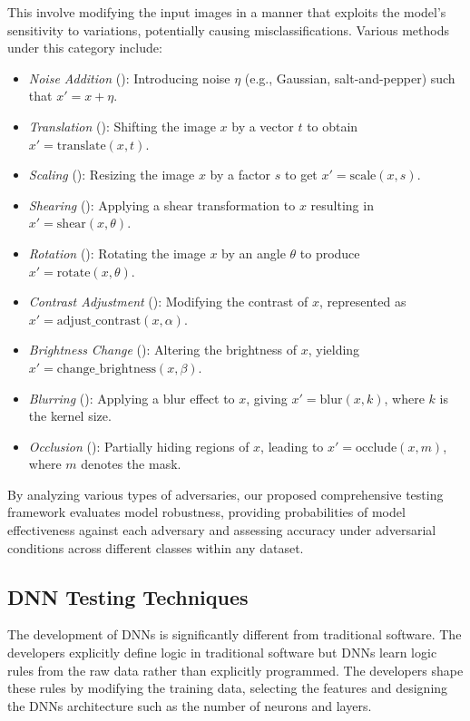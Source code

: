 \documentclass[10pt, conference, a4paper, final]{IEEEtran}
\begin{document}
This involve modifying the input images in a manner that exploits the model's sensitivity to variations, potentially causing misclassifications. Various methods under this category include:
\begin{itemize}[$\bullet$]
    \item \emph{Noise Addition} (\noise): Introducing noise $\eta$ (e.g., Gaussian, salt-and-pepper) such that $x' = x + \eta$.
    \item \emph{Translation} (\translation): Shifting the image $x$ by a vector $t$ to obtain $x' = \text{translate}(x, t)$.
    \item \emph{Scaling} (\scale): Resizing the image $x$ by a factor $s$ to get $x' = \text{scale}(x, s)$.
    \item \emph{Shearing} (\shear): Applying a shear transformation to $x$ resulting in $x' = \text{shear}(x, \theta)$.
    \item \emph{Rotation} (\rotation): Rotating the image $x$ by an angle $\theta$ to produce $x' = \text{rotate}(x, \theta)$.
    \item \emph{Contrast Adjustment} (\contrast): Modifying the contrast of $x$, represented as $x' = \text{adjust\_contrast}(x, \alpha)$.
    \item \emph{Brightness Change} (\brightness): Altering the brightness of $x$, yielding $x' = \text{change\_brightness}(x, \beta)$.
    \item \emph{Blurring} (\blur): Applying a blur effect to $x$, giving $x' = \text{blur}(x, k)$, where $k$ is the kernel size.
    \item \emph{Occlusion} (\occlusion): Partially hiding regions of $x$, leading to $x' = \text{occlude}(x, m)$, where $m$ denotes the mask.
\end{itemize}

By analyzing various types of adversaries, our proposed comprehensive testing framework evaluates model robustness, providing probabilities of model effectiveness against each adversary and assessing accuracy under adversarial conditions across different classes within any dataset.


\subsection {DNN Testing Techniques}
The development of DNNs is significantly different from traditional software. The developers explicitly define logic in traditional software but DNNs learn logic rules from the raw data rather than explicitly programmed. The developers shape these rules by modifying the training data, selecting the features and designing the DNNs architecture such as the number of neurons and layers.
\end{document}
